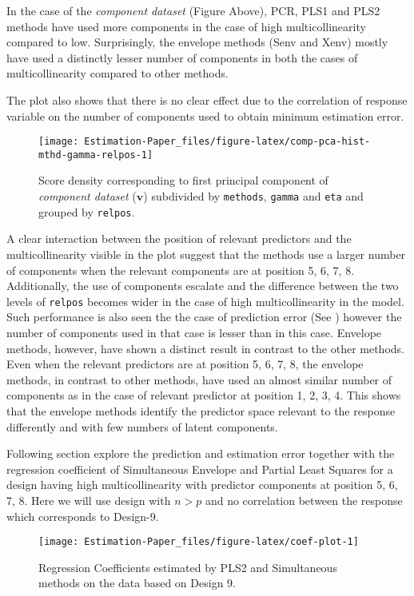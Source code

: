 \documentclass[12pt,3p,authoryear]{elsarticle}
\begin{document}
In the case of the \emph{component dataset} (Figure Above), PCR, PLS1 and PLS2 methods have used more components in the case of high multicollinearity compared to low. Surprisingly, the envelope methods (Senv and Xenv) mostly have used a distinctly lesser number of components in both the cases of multicollinearity compared to other methods.

The plot also shows that there is no clear effect due to the correlation of response variable on the number of components used to obtain minimum estimation error.

\begin{figure}[!htb]
\texttt{[image: Estimation-Paper\_files/figure-latex/comp-pca-hist-mthd-gamma-relpos-1]} \caption{Score density corresponding to first principal component of \emph{component dataset} (\(\mathbf{v}\)) subdivided by \texttt{methods}, \texttt{gamma} and \texttt{eta} and grouped by \texttt{relpos}.}\label{fig:comp-pca-hist-mthd-gamma-relpos}
\end{figure}

A clear interaction between the position of relevant predictors and the multicollinearity visible in the plot suggest that the methods use a larger number of components when the relevant components are at position 5, 6, 7, 8. Additionally, the use of components escalate and the difference between the two levels of \texttt{relpos} becomes wider in the case of high multicollinearity in the model. Such performance is also seen the the case of prediction error (See \citet{rimal2019pred}) however the number of components used in that case is lesser than in this case. Envelope methods, however, have shown a distinct result in contrast to the other methods. Even when the relevant predictors are at position 5, 6, 7, 8, the envelope methods, in contrast to other methods, have used an almost similar number of components as in the case of relevant predictor at position 1, 2, 3, 4. This shows that the envelope methods identify the predictor space relevant to the response differently and with few numbers of latent components.

Following section explore the prediction and estimation error together with the regression coefficient of Simultaneous Envelope and Partial Least Squares for a design having high multicollinearity with predictor components at position 5, 6, 7, 8. Here we will use design with \(n>p\) and no correlation between the response which corresponds to Design-9.

\begin{figure}
\texttt{[image: Estimation-Paper\_files/figure-latex/coef-plot-1]} \caption{Regression Coefficients estimated by PLS2 and Simultaneous methods on the data based on Design 9.}\label{fig:coef-plot}
\end{figure}
\end{document}
